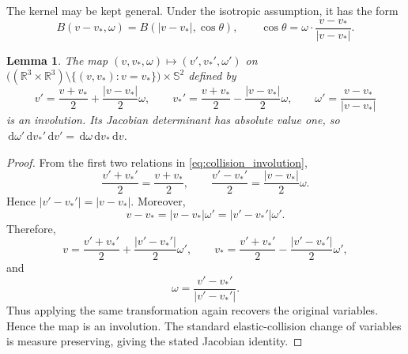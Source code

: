 \documentclass[11pt]{article}
\newcommand{\R}{\mathbb{R}}
\newcommand{\Sph}{\mathbb{S}^{2}}
\newcommand{\dd}{\,\mathrm{d}}
\theoremstyle{plain}
\newtheorem{lemma}{Lemma}
\begin{document}
The kernel may be kept general. Under the isotropic assumption, it has the form
\begin{equation}
B(v-v_*,\omega)=B(|v-v_*|,\cos\theta),
\qquad
\cos\theta=\omega\cdot\frac{v-v_*}{|v-v_*|}.
\label{eq:isotropic_kernel}
\end{equation}


\begin{center}
\end{center}

\begin{lemma}
The map
$(v,v_*,\omega)\mapsto (v',v_*',\omega')$ on
$\big((\R^3\times\R^3)\setminus\{(v,v_*):v=v_*\}\big)\times\Sph$ defined by
\begin{equation}
v'=\frac{v+v_*}{2}+\frac{|v-v_*|}{2}\omega,
\qquad
v_*'=\frac{v+v_*}{2}-\frac{|v-v_*|}{2}\omega,
\qquad
\omega'=\frac{v-v_*}{|v-v_*|}
\label{eq:collision_involution}
\end{equation}
is an involution. Its Jacobian determinant has absolute value one, so $\dd\omega'\dd v_*'\dd v'=\dd\omega\dd v_*\dd v$.
\end{lemma}

\begin{proof}
From the first two relations in \eqref{eq:collision_involution},
\[
\frac{v'+v_*'}{2}=\frac{v+v_*}{2},
\qquad
\frac{v'-v_*'}{2}=\frac{|v-v_*|}{2}\omega.
\]
Hence $|v'-v_*'|=|v-v_*|$. Moreover,
\[
v-v_*=|v-v_*|\omega'=|v'-v_*'|\omega'.
\]
Therefore,
\[
v=\frac{v'+v_*'}{2}+\frac{|v'-v_*'|}{2}\omega',
\qquad
v_*=\frac{v'+v_*'}{2}-\frac{|v'-v_*'|}{2}\omega',
\]
and
\[
\omega=\frac{v'-v_*'}{|v'-v_*'|}.
\]
Thus applying the same transformation again recovers the original variables. Hence the map is an involution. The standard elastic-collision change of variables is measure preserving, giving the stated Jacobian identity.
\end{proof}
\end{document}
